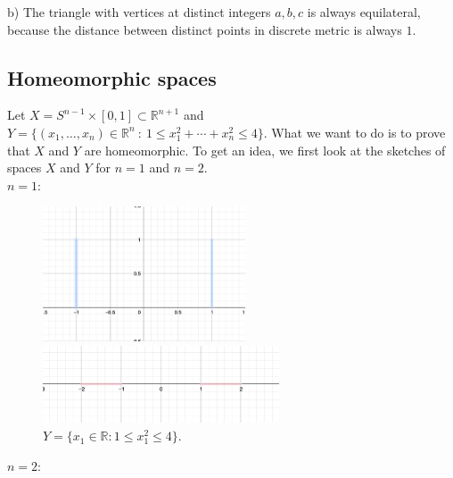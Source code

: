 \documentclass[a4paper,11pt]{article}
\begin{document}
\noindent
b) The triangle with vertices at distinct integers $a, b, c$ is always equilateral, because the distance between distinct points in discrete metric is always $1$.


\subsection{Homeomorphic spaces}

Let $X = S^{n - 1} \times [0,1] \subset \mathbb{R}^{n+1}$ and $Y = \{ (x_1, \ldots, x_n) \in \mathbb{R}^n \ : \ 1 \leq x_1^2 + \cdots + x_n^2 \leq 4 \}$. What we want to do is to prove that $X$ and $Y$ are homeomorphic.
To get an idea, we first look at the sketches of spaces $X$ and $Y$ for $n = 1$ and $n = 2$.
\\
$n = 1:$

\begin{figure}[ht]
     \begin{minipage}{0.5\textwidth}
         \centering
         \includegraphics[width=60mm]{X_n1.png}
         \caption{$X = S^0 \times [0,1] \subset \mathbb{R}^2$.}
       \end{minipage}\hfill
     \begin{minipage}{0.5\textwidth}
         \centering
         \includegraphics[width=70mm]{Y_n1.png}
         \caption{$ Y = \{ x_1 \in \mathbb{R} : 1 \leq x_1^2 \leq 4 \}$.}
       \end{minipage}\hfill
    \end{figure}

\noindent
\newpage
$n = 2:$
\end{document}
